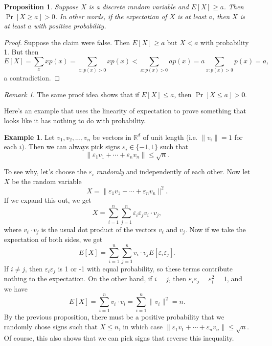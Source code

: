 \documentclass[12pt]{article}
\theoremstyle{plain}
\newtheorem{proposition}[theorem]{Proposition}
\theoremstyle{definition}
\newtheorem{example}[theorem]{Example}
\theoremstyle{remark}
\newtheorem{remark}[theorem]{Remark}
\newcommand{\R}{\mathbb{R}}
\begin{document}
\begin{proposition}
    Suppose $X$ is a discrete random variable and $E[X] \geq a$.
    Then $\Pr[X \geq a] > 0$.
    In other words, if the expectation of $X$ is at least $a$, then $X$ is at least $a$ with positive probability.
\end{proposition}
\begin{proof}
    Suppose the claim were false.
    Then $E[X]\geq a$ but $X<a$ with probability 1.
    But then
    \[
        E[X] = \sum_x xp(x) = \sum_{x: p(x)>0}x p(x) < \sum_{x: p(x)>0}a p(x) = a\sum_{x: p(x)>0}p(x) = a,
    \]
    a contradiction.
\end{proof}
\begin{remark}
    The same proof idea shows that if $E[X]\leq a$, then $\Pr[X \leq a] > 0$.
\end{remark}

Here's an example that uses the linearity of expectation to prove something that looks like it has nothing to do with probability.
\begin{example}
    Let $v_1, v_2, \ldots, v_n$ be vectors in $\R^d$ of unit length (i.e. $\|v_i\| = 1$ for each $i$).
    Then we can always pick signs $\varepsilon_i \in \{-1, 1\}$ such that
    \[
        \|\varepsilon_1 v_1 + \cdots + \varepsilon_n v_n \| \leq \sqrt{n}.
    \]

    To see why, let's choose the $\varepsilon_i$ \emph{randomly} and independently of each other.
    Now let $X$ be the random variable
    \[
        X = \|\varepsilon_1 v_1 + \cdots + \varepsilon_n v_n\|^2.
    \]
    If we expand this out, we get
    \[
        X = \sum_{i=1}^n\sum_{j=1}^n\varepsilon_i\varepsilon_j v_i\cdot v_j,
    \]
    where $v_i \cdot v_j$ is the usual dot product of the vectors $v_i$ and $v_j$.
    Now if we take the expectation of both sides, we get
    \[
        E[X] = \sum_{i=1}^n\sum_{j=1}^n v_i\cdot v_j E[\varepsilon_i\varepsilon_j].
    \]
    If $i\neq j$, then $\varepsilon_i\varepsilon_j$ is 1 or -1 with equal probability, so these terms contribute nothing to the expectation.
    On the other hand, if $i=j$, then $\varepsilon_i\varepsilon_j = \varepsilon_i^2 = 1$, and we have
    \[
        E[X] = \sum_{i=1}^nv_i\cdot v_i = \sum_{i=1}^n\|v_i\|^2 = n.
    \]
    By the previous proposition, there must be a positive probability that we randomly chose signs such that $X \leq n$, in which case $\|\varepsilon_1 v_1 + \cdots + \varepsilon _n v_n\| \leq \sqrt{n}$.
    Of course, this also shows that we can pick signs that reverse this inequality.
\end{example}
\end{document}
